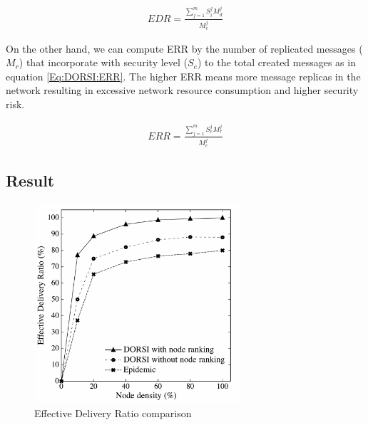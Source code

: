 \begin{eqnarray}
\label{Eq:DORSI:EDR}
EDR=\frac { \sum _{ j=1 }^{ m }{ { S }_{ i }^{ j }{ M }_{ d }^{ j } }  }{ { M }_{ c }^{ j } } 
\end{eqnarray}

On the other hand, we can compute ERR by the number of replicated messages ($M_r$) that incorporate with security level ($S_e$) to the total created messages as in equation \ref{Eq:DORSI:ERR}. 
The higher ERR means more message replicas in the network resulting in excessive network resource consumption and higher security risk.

\begin{eqnarray}
\label{Eq:DORSI:ERR}
ERR=\frac { \sum _{ j=1 }^{ m }{ { S }_{ e }^{ j }{ M }_{ r }^{ j } }  }{ { M }_{ c }^{ j } } 
\end{eqnarray}

\subsection{Result}

\begin{figure}[!h]
\centering
\includegraphics[width=3in]{Graphs/EDR_NodeDensity.pdf}
\caption{Effective Delivery Ratio comparison}
\label{Fig:DORSI:Effective Delivery Ratio comparison}
\end{figure}

